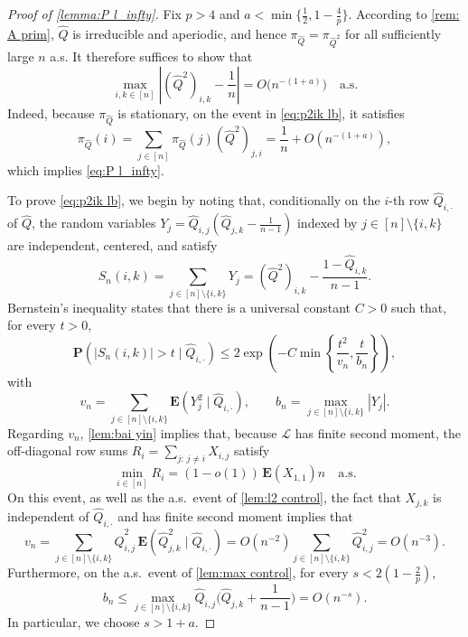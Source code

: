 \documentclass[12pt]{amsart}
\newcommand\wh[1]{\widehat{#1}}
\renewcommand{\P}{\mathbf{P}}
\newcommand{\E}{\mathbf{E}}
\DeclareMathOperator{\1}{\mathbf{1}}
\begin{document}
\begin{proof}[Proof of \cref{lemma:P l_infty}]
	Fix $p > 4$ and $a < \min\{\frac12,1-\frac{4}{p}\}$. According to \cref{rem: A prim}, $\wh{Q}$ is irreducible and aperiodic, and hence $\pi_{\wh{Q}} = \pi_{\wh{Q}^2}$ for all sufficiently large $n$ a.s. It therefore suffices to show that
\begin{equation}\label{eq:p2ik lb}
	\max_{i,k \in [n]} \left| (\wh{Q}^2)_{i,k} - \frac1n \right| = O\big(n^{-(1+a)} \big) \quad \mathrm{a.s.}
\end{equation}
Indeed, because $\pi_{\wh{Q}}$ is stationary, on the event in \cref{eq:p2ik lb}, it satisfies
\[
	\pi_{\wh{Q}} (i) = \sum_{j \in [n]} \pi_{\wh{Q}} (j) (\wh{Q}^2)_{j,i} = \frac{1}{n} + O(n^{-(1+a)}),
\]
which implies \cref{eq:P l_infty}.

To prove \cref{eq:p2ik lb}, we begin by noting that, conditionally on the $i$-th row $\wh{Q}_{i,\cdot}$ of $\wh{Q}$, the random variables $Y_j = \wh{Q}_{i,j} (\wh{Q}_{j,k} - \frac{1}{n-1})$ indexed by $j \in [n]\setminus\{i,k\}$ are independent, centered, and satisfy
\begin{equation}\label{eq:sumy}
	S_n (i,k) = \sum_{j \in [n]\setminus\{i,k\}} Y_j = (\wh{Q}^2)_{i,k} - \frac{1-\wh{Q}_{i,k}}{n-1}. 
\end{equation}
Bernstein's inequality states that there is a universal constant $C > 0$ such that, for every $t > 0$,
\begin{equation}\label{eq:bernstein}
	\P \left( |S_n (i,k)| > t \mid \wh{Q}_{i,\cdot} \right) \leq 2 \exp \left(- C \min\left\{\frac{t^2}{v_n}, \frac{t}{b_n} \right\} \right),
\end{equation}
with
\[
	v_n = \sum_{j \in [n]\setminus\{i,k\}} \E (Y_j^2 \mid \wh{Q}_{i,\cdot}), \qquad b_n = \max_{j \in [n]\setminus\{i,k\}} |Y_j|.
\]
Regarding $v_n$, \cref{lem:bai yin} implies that, because $\mathcal{L}$ has finite second moment, the off-diagonal row sums $R_i = \sum_{j:\, j \neq i} X_{i,j}$ satisfy
\[
	\min_{i \in [n]} R_i = (1-o(1))\, \E(X_{1,1}) n \quad \mathrm{a.s.}
\]
On this event, as well as the a.s.\ event of \cref{lem:l2 control}, the fact that $X_{j,k}$ is independent of $\wh{Q}_{i,\cdot}$ and has finite second moment implies that
\[
	v_n = \sum_{j \in [n]\setminus\{i,k\}} \wh{Q}^2_{i,j} \, \E (\wh{Q}^2_{j,k} \mid \wh{Q}_{i,\cdot}) = O(n^{-2}) \sum_{j \in [n]\setminus\{i,k\}} \wh{Q}^2_{i,j} = O(n^{-3}).
\]
Furthermore, on the a.s.\ event of \cref{lem:max control}, for every $s < 2(1 - \frac{2}{p})$, 
\[
	b_n \leq \max_{j \in [n]\setminus\{i,k\}} \wh{Q}_{i,j} \Big(\wh{Q}_{j,k} + \frac{1}{n-1}\Big) = O(n^{-s}).
\]
In particular, we choose $s > 1+a$.


\end{proof}
\end{document}
